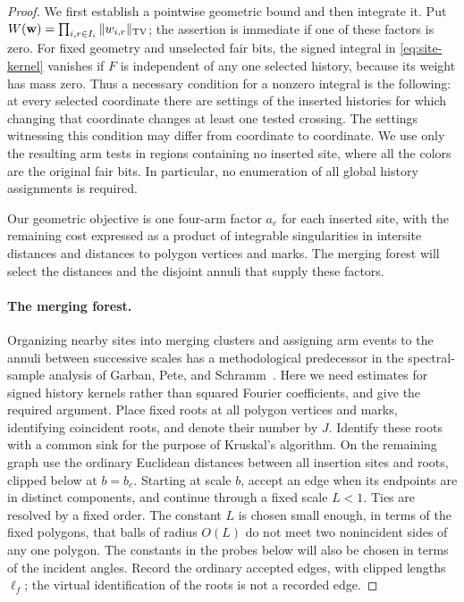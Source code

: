 \begin{proof}
We first establish a pointwise geometric bound and then integrate it.
Put $W(\mathbf w)=\prod_{i,r\in I_i}\|w_{i,r}\|_{\operatorname{TV}}$; the assertion
is immediate if one of these factors is zero.
For fixed geometry and unselected fair bits, the signed integral in
\eqref{eq:site-kernel} vanishes if $F$ is independent of any one
selected history, because its weight has mass zero.  Thus a necessary
condition for a nonzero integral is the following: at every selected
coordinate there are settings of the inserted histories for which
changing that coordinate changes at least one tested crossing.
The settings witnessing this condition may differ from coordinate to
coordinate.  We use only the resulting arm tests in regions containing
no inserted site, where all the colors are the original fair bits.
In particular, no enumeration of all global history assignments is
required.

Our geometric objective is one four-arm factor $a_e$ for each inserted
site, with the remaining cost expressed as a product of integrable
singularities in intersite distances and distances to polygon vertices
and marks.  The
merging forest will select the distances and the disjoint annuli that
supply these factors.

\paragraph{The merging forest.}
Organizing nearby sites into merging clusters and assigning arm events
to the annuli between successive scales has a methodological
predecessor in the spectral-sample analysis of Garban, Pete, and
Schramm~\cite[Sections~4.2--4.3]{gps-fourier}.  Here we need estimates
for signed history kernels rather than squared Fourier coefficients,
and give the required argument.
Place fixed roots at all polygon vertices and marks, identifying
coincident roots, and denote their number by $J$.  Identify these roots
with a common sink for the purpose of Kruskal's algorithm.  On the
remaining graph use the ordinary Euclidean distances between all
insertion sites and roots, clipped below at $b=b_e$.  Starting at scale
$b$, accept an edge when its endpoints are in distinct components, and
continue through a fixed scale $L<1$.  Ties are resolved by a fixed
order.  The constant $L$ is chosen small enough, in terms of the fixed
polygons, that balls of radius $O(L)$ do not meet two nonincident sides
of any one polygon.  The constants in the probes below will also be
chosen in terms of the incident angles.  Record the ordinary
accepted edges, with clipped lengths $\ell_f$; the virtual
identification of the roots is not a recorded edge.


\end{proof}
